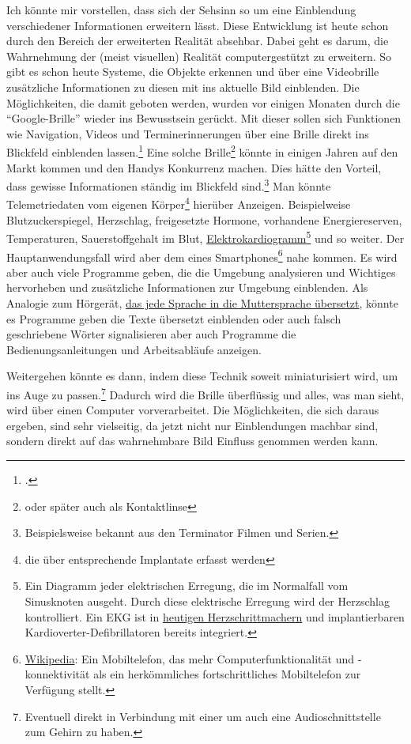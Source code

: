 Ich könnte mir vorstellen, dass sich der Sehsinn so um eine Einblendung verschiedener Informationen
erweitern lässt. Diese Entwicklung ist heute schon durch den Bereich der erweiterten Realität
absehbar.
Dabei geht es darum, die Wahrnehmung der (meist visuellen) Realität computergestützt zu erweitern. So
gibt es schon heute Systeme, die Objekte erkennen und über eine Videobrille zusätzliche Informationen
zu diesen mit ins aktuelle Bild einblenden. Die Möglichkeiten, die damit geboten werden, wurden vor
einigen Monaten durch die \enquote{Google-Brille} wieder ins Bewusstsein
gerückt. Mit dieser sollen sich Funktionen wie Navigation, Videos und Terminerinnerungen über eine
Brille direkt ins Blickfeld einblenden lassen.\footcite{Heise:TR:Project_Glass}
Eine solche Brille\footnote{oder später auch als
Kontaktlinse} könnte in einigen Jahren auf den Markt kommen und den Handys Konkurrenz machen. Dies
hätte den Vorteil, dass gewisse Informationen ständig im Blickfeld sind.\footnote{Beispielsweise
bekannt aus den Terminator Filmen und Serien.} Man könnte Telemetriedaten vom eigenen
Körper\footnote{die über entsprechende Implantate erfasst werden}
hierüber Anzeigen. Beispielweise Blutzuckerspiegel, Herzschlag, freigesetzte Hormone, vorhandene
Energiereserven, Temperaturen, Sauerstoffgehalt im Blut,
\href{http://de.wikipedia.org/wiki/Elektrokardiogramm}{Elektrokardiogramm}\footnote{%
Ein Diagramm jeder elektrischen Erregung, die im
Normalfall vom Sinusknoten ausgeht. Durch diese elektrische Erregung wird der Herzschlag
kontrolliert. Ein EKG ist in \hyperref[sec:Robin:topical:Pacemaker]{heutigen Herzschrittmachern}
und implantierbaren Kardioverter-Defibrillatoren
bereits integriert.} und so weiter.
Der Hauptanwendungsfall wird aber dem eines
Smartphones\footnote{\href{http://de.wikipedia.org/wiki/Smartphone}{Wikipedia}: Ein Mobiltelefon, das
mehr Computerfunktionalität und -konnektivität als ein herkömmliches fortschrittliches Mobiltelefon
zur Verfügung stellt.} nahe kommen. Es wird aber auch viele Programme geben, die die Umgebung
analysieren und Wichtiges hervorheben und zusätzliche Informationen zur Umgebung einblenden. Als
Analogie zum Hörgerät, \hyperref[sec:Robin:future:hearing:Babel_Fish]{das jede Sprache in die
Muttersprache übersetzt}, könnte es Programme geben die Texte übersetzt einblenden oder auch falsch
geschriebene Wörter signalisieren aber auch Programme die Bedienungsanleitungen und Arbeitsabläufe
anzeigen.

Weitergehen könnte es dann, indem diese Technik soweit miniaturisiert wird, um ins Auge zu
passen.\footnote{Eventuell direkt in Verbindung mit einer  um auch
eine Audioschnittstelle zum Gehirn zu haben.
} Dadurch wird die Brille überflüssig und alles, was man
sieht, wird über einen Computer vorverarbeitet. Die Möglichkeiten, die sich daraus ergeben, sind sehr
vielseitig, da jetzt nicht nur Einblendungen machbar sind, sondern direkt auf das wahrnehmbare Bild
Einfluss genommen werden kann.

